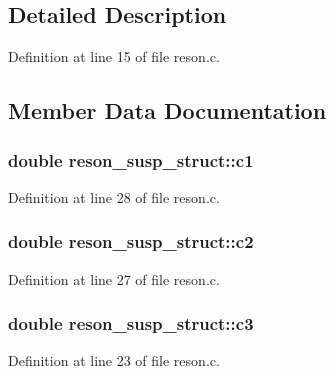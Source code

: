 \subsection{Detailed Description}


Definition at line 15 of file reson.\+c.



\subsection{Member Data Documentation}
\subsubsection[{\texorpdfstring{c1}{c1}}]{\setlength{\rightskip}{0pt plus 5cm}double reson\+\_\+susp\+\_\+struct\+::c1}\hypertarget{structreson__susp__struct_a6e1cc1a318a235e1e2f2d1e6c2774ca3}{}\label{structreson__susp__struct_a6e1cc1a318a235e1e2f2d1e6c2774ca3}


Definition at line 28 of file reson.\+c.

\subsubsection[{\texorpdfstring{c2}{c2}}]{\setlength{\rightskip}{0pt plus 5cm}double reson\+\_\+susp\+\_\+struct\+::c2}\hypertarget{structreson__susp__struct_af051dc892640a4cbca3b70be2c042d0f}{}\label{structreson__susp__struct_af051dc892640a4cbca3b70be2c042d0f}


Definition at line 27 of file reson.\+c.

\subsubsection[{\texorpdfstring{c3}{c3}}]{\setlength{\rightskip}{0pt plus 5cm}double reson\+\_\+susp\+\_\+struct\+::c3}\hypertarget{structreson__susp__struct_a7e73c8349f1a7912f579385a996326ae}{}\label{structreson__susp__struct_a7e73c8349f1a7912f579385a996326ae}


Definition at line 23 of file reson.\+c.

